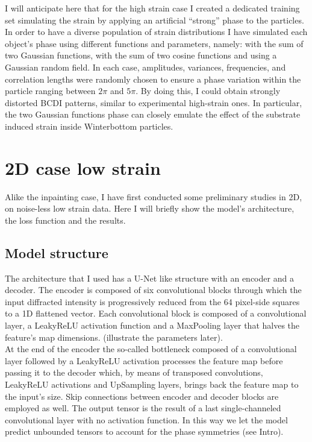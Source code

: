I will anticipate here that for the high strain case I created a dedicated training set simulating the strain by applying 
an artificial ``strong'' phase to the particles. In order to have a diverse population of strain distributions I have 
simulated each object's phase using different functions and parameters, namely: with the sum of two Gaussian functions,
with the sum of two cosine functions and using a Gaussian random field. In each case, amplitudes, variances, 
frequencies, and correlation lengths were randomly chosen to ensure a phase variation within the particle ranging between 
$2\pi$ and $5\pi$. By doing this, I could obtain strongly distorted BCDI patterns, similar to experimental high-strain ones. 
In particular, the two Gaussian functions phase can closely emulate the effect of the substrate induced strain inside Winterbottom 
particles. 

\section{2D case low strain}\label{chp:2d_nostrain}
Alike the inpainting case, I have first conducted some preliminary studies in 2D, on noise-less low strain data. Here I will 
briefly show the model's architecture, the loss function and the results. 
\subsection{Model structure}
The architecture that I used has a U-Net like structure with an encoder and a decoder. 
The encoder is composed of six convolutional blocks through which the input diffracted intensity is progressively 
reduced from the 64 pixel-side squares to a 1D flattened vector. Each convolutional block is composed of a convolutional 
layer, a LeakyReLU activation function and a MaxPooling layer that halves the feature's map dimensions. (illustrate the 
parameters later). \\
At the end of the encoder the so-called bottleneck composed of a convolutional layer followed by a LeakyReLU activation 
processes the feature map before passing it to the decoder which, by means of transposed convolutions, LeakyReLU activations 
and UpSampling layers, brings back the feature map to the input's size. Skip connections between encoder and decoder blocks 
are employed as well. The output tensor is the result of a last single-channeled convolutional layer with no activation function. 
In this way we let the model predict unbounded tensors to account for the phase symmetries (see Intro). 

